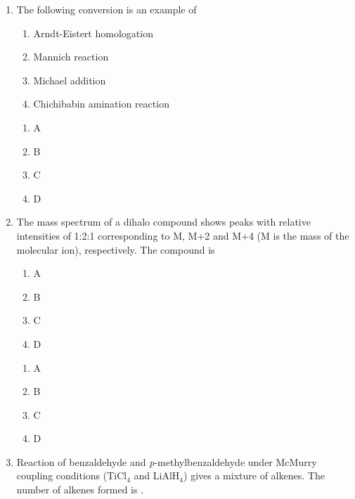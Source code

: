 \documentclass[journal,12pt,onecolumn]{exam}
\theoremstyle{remark}
\newcommand{\correct}{\textcolor{correctgreen}{\checkmark}}
\newcommand{\wrong}{\textcolor{wrongred}{\ding{55}}} %
\begin{document}
\begin{enumerate}
\item
The following conversion is an example of



\begin{enumerate}
    \item Arndt-Eistert homologation
    \item Mannich reaction
    \item Michael addition
    \item Chichibabin amination reaction
\end{enumerate}

\hfill{}

\begin{multicols}{2}
\begin{enumerate}
    \item \correct A
    \item \wrong B
    \item \wrong C
    \item \wrong D
\end{enumerate}
\end{multicols}


\item
The mass spectrum of a dihalo compound shows peaks with relative intensities of 1:2:1 corresponding to M, M+2 and M+4 (M is the mass of the molecular ion), respectively. The compound is

\begin{enumerate}
    \item A
    \item B
    \item C
    \item D
\end{enumerate}

\hfill{}

\begin{multicols}{2}
\begin{enumerate}
    \item \correct A
    \item \wrong B
    \item \wrong C
    \item \wrong D
\end{enumerate}
\end{multicols}


\item
Reaction of benzaldehyde and \emph{p}-methylbenzaldehyde under McMurry coupling conditions (TiCl$_4$ and LiAlH$_4$) gives a mixture of alkenes. The number of alkenes formed is \underline{\hspace{3cm}}.


\end{enumerate}
\end{document}
